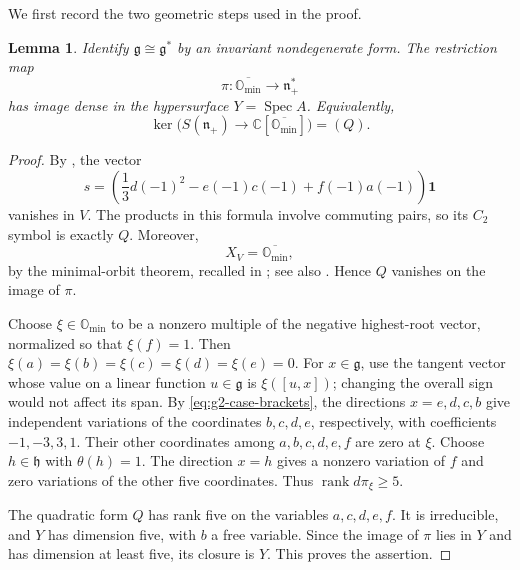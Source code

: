 \documentclass[11pt]{amsart}
\newtheorem{lemma}[theorem]{Lemma}
\theoremstyle{definition}
\theoremstyle{remark}
\newcommand{\C}{\mathbb C}
\newcommand{\g}{\mathfrak g}
\newcommand{\n}{\mathfrak n_+}
\newcommand{\vac}{\mathbf1}
\DeclareMathOperator{\Spec}{Spec}
\DeclareMathOperator{\rank}{rank}
\begin{document}
We first record the two geometric steps used in the proof.


\begin{lemma}\label{lem:g2-case-projection}
Identify $\g\cong\g^*$ by an invariant nondegenerate form. The restriction
map
\[
 \pi:\overline{\mathbb O_{\min}}\longrightarrow\n^*
\]
has image dense in the hypersurface $Y=\Spec A$. Equivalently,
\[
 \ker\bigl(S(\n)\longrightarrow
 \C[\overline{\mathbb O_{\min}}]\bigr)=(Q).
\]
\end{lemma}
\begin{proof}
By \cite[Propositions~2.3 and~2.4]{AL}, the vector
\begin{equation}\label{eq:g2-case-null}
 s=\left(\frac13d(-1)^2-e(-1)c(-1)+f(-1)a(-1)\right)\vac
\end{equation}
vanishes in $V$. The products in this formula involve commuting pairs,
so its $C_2$ symbol is exactly $Q$.
Moreover,
\begin{equation}\label{eq:g2-case-associated}
 X_V=\overline{\mathbb O_{\min}},
\end{equation}
by the minimal-orbit theorem, recalled in \cite[Theorem~6.2]{AK}; see
also \cite{AMJoseph}. Hence $Q$ vanishes on the image of $\pi$.

Choose $\xi\in\mathbb O_{\min}$ to be a nonzero multiple of the negative
highest-root vector, normalized so that $\xi(f)=1$.
Then $\xi(a)=\xi(b)=\xi(c)=\xi(d)=\xi(e)=0$.
For $x\in\g$, use the tangent vector whose value on a linear function
$u\in\g$ is $\xi([u,x])$; changing the overall sign would not affect
its span. By \eqref{eq:g2-case-brackets}, the directions $x=e,d,c,b$
give independent variations of the coordinates $b,c,d,e$, respectively,
with coefficients $-1,-3,3,1$. Their other coordinates among $a,b,c,d,e,f$
are zero at $\xi$. Choose $h\in\mathfrak h$ with $\theta(h)=1$.
The direction $x=h$ gives a nonzero variation of $f$ and zero variations
of the other five coordinates. Thus $\rank d\pi_\xi\geq5$.

The quadratic form $Q$ has rank five on the variables $a,c,d,e,f$.
It is irreducible, and $Y$ has dimension five, with $b$ a free variable.
Since the image of $\pi$ lies in $Y$ and has dimension at least five,
its closure is $Y$. This proves the assertion.
\end{proof}

\end{document}
